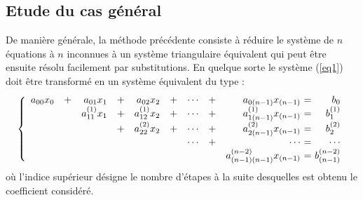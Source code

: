 \subsection*{Etude du cas général}
\label{casgeneral}
De manière générale, la méthode précédente consiste à réduire le système de $n$ 
équations à $n$ inconnues à un système triangulaire équivalent qui peut 
être ensuite résolu facilement par substitutions. En quelque sorte le système 
(\ref{eq1}) doit être transformé en un système équivalent du type :
\begin{equation}\label{eq2}
\left\{
\begin{array}{rcrcrcrcr@{\ =\ }r}
a_{00}x_0 &+& a_{01}x_1       &+& a_{02}x_2       &+& \cdots &+& a_{0(n-1)}x_{(n-1)}       & b_0\\
          & & a^{(1)}_{11}x_1 &+& a^{(1)}_{12}x_2 &+& \cdots &+& a^{(1)}_{1(n-1)}x_{(n-1)} & b^{(1)}_1\\
          & &                 &+& a^{(2)}_{22}x_2 &+& \cdots &+& a^{(2)}_{2(n-1)}x_{(n-1)} & b^{(2)}_2\\
          & &                 & &                 & & \cdots &+& \cdots           & \cdots\\
          & &                 & &                 & &        & & a^{(n-2)}_{(n-1)(n-1)}x_{(n-1)}   & b^{(n-2)}_{(n-1)}
\end{array}
\right.
\end{equation}
où l'indice supérieur désigne le nombre d'étapes à la suite desquelles est obtenu le 
coefficient considéré.

